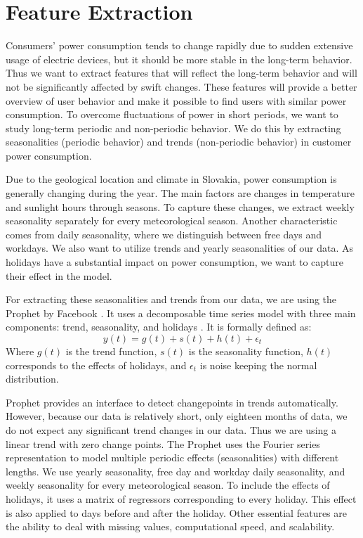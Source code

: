 \section{Feature Extraction}
Consumers' power consumption tends to change rapidly due to sudden extensive usage of electric devices, but it should be more stable in the long-term behavior. Thus we want to extract features that will reflect the long-term behavior and will not be significantly affected by swift changes. These features will provide a better overview of user behavior and make it possible to find users with similar power consumption. To overcome fluctuations of power in short periods, we want to study long-term periodic and non-periodic behavior. We do this by extracting seasonalities (periodic behavior) and trends (non-periodic behavior) in customer power consumption.

Due to the geological location and climate in Slovakia, power consumption is generally changing during the year. The main factors are changes in temperature and sunlight hours through seasons. To capture these changes, we extract weekly seasonality separately for every meteorological season. Another characteristic comes from daily seasonality, where we distinguish between free days and workdays. We also want to utilize trends and yearly seasonalities of our data. As holidays have a substantial impact on power consumption, we want to capture their effect in the model.

For extracting these seasonalities and trends from our data, we are using the Prophet by Facebook \cite{exp:FbProphet}. It uses a decomposable time series model with three main components: trend, seasonality, and holidays \cite{exp:lin-model}. It is formally defined as:
\begin{equation}
    y(t) = g(t) + s(t) + h(t) + \epsilon_t    
\end{equation}
Where $g(t)$ is the trend function, $s(t)$ is the seasonality function, $h(t)$ corresponds to the effects of holidays, and $\epsilon_t$ is noise keeping the normal distribution.

Prophet provides an interface to detect changepoints in trends automatically. However, because our data is relatively short, only eighteen months of data, we do not expect any significant trend changes in our data. Thus we are using a linear trend with zero change points. The Prophet uses the Fourier series representation to model multiple periodic effects (seasonalities) with different lengths. We use yearly seasonality, free day and workday daily seasonality, and weekly seasonality for every meteorological season. To include the effects of holidays, it uses a matrix of regressors corresponding to every holiday. This effect is also applied to days before and after the holiday. Other essential features are the ability to deal with missing values, computational speed, and scalability.

